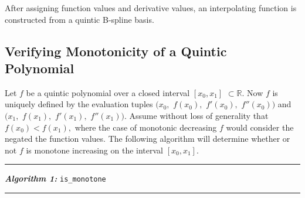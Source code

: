 \documentclass{scspaperproc}
\theoremstyle{scsthe}
\begin{document}
After assigning function values and derivative values, an interpolating function is constructed from a quintic B-spline basis.

\vspace{10pt}


\subsection{Verifying Monotonicity of a Quintic Polynomial}
\label{is_monotone}
Let $f$ be a quintic polynomial over a closed interval $[x_0, x_1]$ $\subset \mathbb{R}$. Now $f$ is uniquely defined by the evaluation tuples $\big(x_0,$ $f(x_0),$ $f'(x_0),$ $f''(x_0)\big)$ and $\big(x_1,$ $f(x_1),$ $f'(x_1),$ $f''(x_1)\big).$ Assume without loss of generality that $f(x_0) < f(x_1),$ where the case of monotonic decreasing $f$ would consider the negated the function values. The following algorithm will determine whether or not $f$ is monotone increasing on the interval $[x_0, x_1].$

\vspace{10pt}%
\hrule%
\vspace{3pt}%
\noindent\textbf{\textit{Algorithm 1:}} \texttt{is\_monotone}%
\vspace{3pt}%
\hrule%
\end{document}
